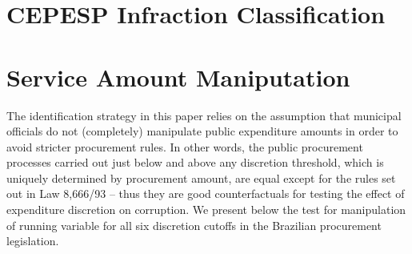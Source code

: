\documentclass[11pt]{article}
\begin{document}
\section{CEPESP Infraction Classification}\label{sec:appendixB}

\section{Service Amount Maniputation}\label{sec:appendixC}

The identification strategy in this paper relies on the assumption that municipal officials do not (completely) manipulate public expenditure amounts in order to avoid stricter procurement rules. In other words, the public procurement processes carried out just below and above any discretion threshold, which is uniquely determined by procurement amount, are equal except for the rules set out in Law 8,666/93 -- thus they are good counterfactuals for testing the effect of expenditure discretion on corruption. We present below the \citet{McCraryManipulationrunningvariable2008} test for manipulation of running variable for all six discretion cutoffs in the Brazilian procurement legislation.
\end{document}
